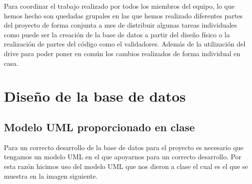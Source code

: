 \documentclass[pdftex,11pt,a4paper]{book}
\begin{document}
Para coordinar el trabajo realizado por todos los miembros del equipo, lo que hemos hecho son quedadas grupales en las que hemos realizado diferentes partes del proyecto de forma conjunta a mes de distribuir algunas tareas individuales como puede ser la creación de la base de datos a partir del diseño físico o la realización de partes del código como el validadores. Además de la utilización del drive para poder poner en común los cambios realizados de forma individual en casa.



\chapter{Diseño de la base de datos}

\section{Modelo UML proporcionado en clase}

Para un correcto desarrollo de la base de datos para el proyecto es necesario que tengamos un modelo UML en el que apoyarnos para un correcto desarrollo. Por esta razón hicimos uso del modelo UML que nos dieron a clase el cual es el que se muestra en la imagen siguiente.
\end{document}
